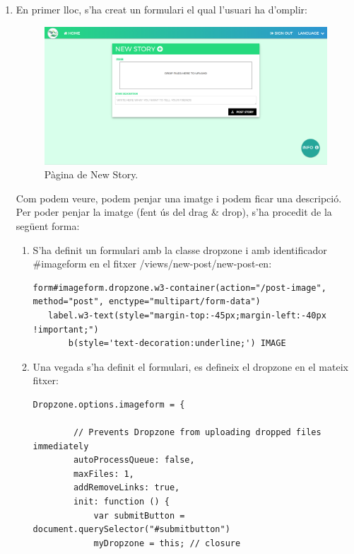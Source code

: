 \documentclass[11pt,catalan,listoffigures,listoftables]{tfgetsinf}
\begin{document}
\begin{enumerate}
\item En primer lloc, s'ha creat un formulari el qual l'usuari ha d'omplir:
\begin{figure}[H]
\includegraphics[width=15cm]{images/image14}
\centering
\caption[Figura 4.9]{Pàgina de New Story.}
\centering
\end{figure}
Com podem veure, podem penjar una imatge i podem ficar una descripció. Per poder penjar la imatge (fent ús del drag \& drop), s'ha procedit de la següent forma:
\begin{enumerate}
\item S'ha definit un formulari amb la classe dropzone i amb identificador \#imageform en el fitxer /views/new-post/new-post-en:
\begin{lstlisting}
form#imageform.dropzone.w3-container(action="/post-image", method="post", enctype="multipart/form-data")
   label.w3-text(style="margin-top:-45px;margin-left:-40px !important;")
       b(style='text-decoration:underline;') IMAGE
\end{lstlisting}
\item Una vegada s'ha definit el formulari, es defineix el dropzone en el mateix fitxer:
\begin{lstlisting}
Dropzone.options.imageform = {

        // Prevents Dropzone from uploading dropped files immediately
        autoProcessQueue: false,
        maxFiles: 1,
        addRemoveLinks: true,
        init: function () {
            var submitButton = document.querySelector("#submitbutton")
            myDropzone = this; // closure


\end{lstlisting}
\end{enumerate}
\end{enumerate}
\end{document}
